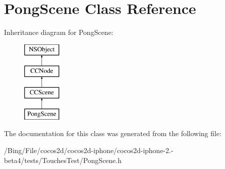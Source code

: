 \hypertarget{interface_pong_scene}{\section{Pong\-Scene Class Reference}
\label{interface_pong_scene}
}
Inheritance diagram for Pong\-Scene\-:\begin{figure}[H]
\begin{center}
\leavevmode
\includegraphics[height=4.000000cm]{interface_pong_scene}
\end{center}
\end{figure}


The documentation for this class was generated from the following file\-:\begin{DoxyCompactItemize}
\item 
/\-Bing/\-File/cocos2d/cocos2d-\/iphone/cocos2d-\/iphone-\/2.-\/beta4/tests/\-Touches\-Test/Pong\-Scene.\-h\end{DoxyCompactItemize}
